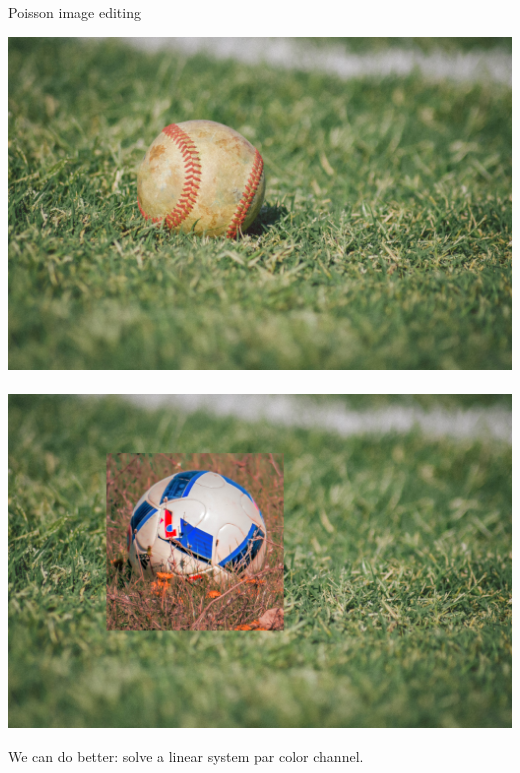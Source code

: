 \documentclass[UKenglish,aspectratio=169]{beamer}
\begin{document}
\begin{frame}{Poisson image editing}
\centerline{    \includegraphics[width=.36\linewidth]{../manuscript/img/pie_baseball.png}~\raisebox{6.5\height}{\LARGE{+}}~
    ~\raisebox{8.5\height}{\LARGE{=}}~
    \includegraphics[width=.36\linewidth]{../manuscript/img/pie_overlay.png}}
\pause
We can do better: solve a linear system par color channel.

\vspace{10pt}


\end{frame}
\end{document}
